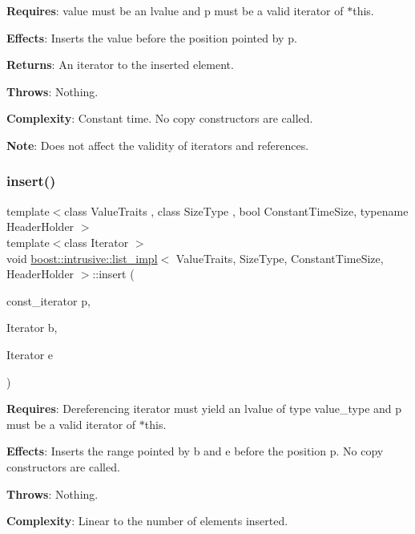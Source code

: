 {\bfseries Requires}\+: value must be an lvalue and p must be a valid iterator of $\ast$this.

{\bfseries Effects}\+: Inserts the value before the position pointed by p.

{\bfseries Returns}\+: An iterator to the inserted element.

{\bfseries Throws}\+: Nothing.

{\bfseries Complexity}\+: Constant time. No copy constructors are called.

{\bfseries Note}\+: Does not affect the validity of iterators and references. \mbox{\label{classboost_1_1intrusive_1_1list__impl_afabe1de903e672ab93e55782fb5f0006}} 
\subsubsection{\texorpdfstring{insert()}{insert()}\hspace{0.1cm}{\footnotesize\ttfamily [2/2]}}
{\footnotesize\ttfamily template$<$class Value\+Traits , class Size\+Type , bool Constant\+Time\+Size, typename Header\+Holder $>$ \\
template$<$class Iterator $>$ \\
void \hyperlink{classboost_1_1intrusive_1_1list__impl}{boost\+::intrusive\+::list\+\_\+impl}$<$ Value\+Traits, Size\+Type, Constant\+Time\+Size, Header\+Holder $>$\+::insert (\begin{DoxyParamCaption}\item[{const\+\_\+iterator}]{p,  }\item[{Iterator}]{b,  }\item[{Iterator}]{e }\end{DoxyParamCaption})\hspace{0.3cm}{\ttfamily [inline]}}

{\bfseries Requires}\+: Dereferencing iterator must yield an lvalue of type value\+\_\+type and p must be a valid iterator of $\ast$this.

{\bfseries Effects}\+: Inserts the range pointed by b and e before the position p. No copy constructors are called.

{\bfseries Throws}\+: Nothing.

{\bfseries Complexity}\+: Linear to the number of elements inserted.

